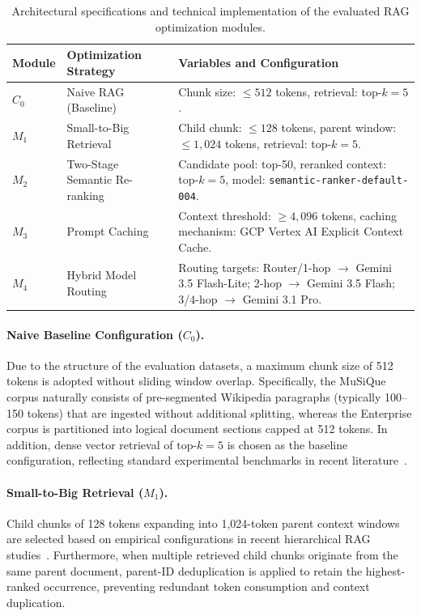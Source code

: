     \begin{table}[htbp]
    \centering
    \small
    \caption[Architectural specifications of optimization modules]{Architectural specifications and technical implementation of the evaluated RAG optimization modules.}
    \label{tab:optimization_modules}
    \begin{tabularx}{\textwidth}{l p{4.5cm} X}
    \toprule
    \textbf{Module} & \textbf{Optimization Strategy} & \textbf{Variables and Configuration}\\
    \midrule
    \textbf{$C_0$} & Naive RAG (Baseline)
      & Chunk size: $\le 512$ tokens, retrieval: top-$k = 5$.
      \\
    \addlinespace
    \textbf{$M_1$} & Small-to-Big Retrieval
      & Child chunk: $\le 128$ tokens, parent window: $\le 1,024$ tokens, retrieval: top-$k = 5$.
      \\
    \addlinespace
    \textbf{$M_2$} & Two-Stage Semantic Re-ranking
      & Candidate pool: top-50, reranked context: top-$k = 5$, model: \texttt{semantic-ranker-default-004}.
      \\
    \addlinespace
    \textbf{$M_3$} & Prompt Caching
      & Context threshold: $\ge 4,096$ tokens, caching mechanism: GCP Vertex AI Explicit Context Cache.
       \\
    \addlinespace
    \textbf{$M_4$} & Hybrid Model Routing
      & Routing targets: Router/1-hop $\to$ Gemini 3.5 Flash-Lite;  2-hop $\to$ Gemini 3.5 Flash; 3/4-hop $\to$ Gemini 3.1 Pro.
\\
    \bottomrule
    \end{tabularx}
    \end{table}

\paragraph{Naive Baseline Configuration ($C_0$).}
Due to the structure of the evaluation datasets, a maximum chunk size of 512 tokens is adopted without sliding window overlap. Specifically, the MuSiQue corpus naturally consists of pre-segmented Wikipedia paragraphs (typically 100--150 tokens) that are ingested without additional splitting, whereas the Enterprise corpus is partitioned into logical document sections capped at 512 tokens. In addition, dense vector retrieval of $\text{top-}k = 5$ is chosen as the baseline configuration, reflecting standard experimental benchmarks in recent literature~\citep{smigielski2026chunking, lewis2020rag}.

\paragraph{Small-to-Big Retrieval ($M_1$).}
Child chunks of 128 tokens expanding into 1,024-token parent context windows are selected based on empirical configurations in recent hierarchical RAG studies~\citep{demourajunior2026adaptive, li2026bridgerag, lumer2026rethinking}. Furthermore, when multiple retrieved child chunks originate from the same parent document, parent-ID deduplication is applied to retain the highest-ranked occurrence, preventing redundant token consumption and context duplication.

